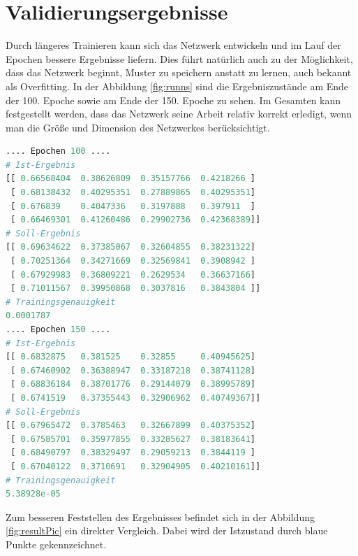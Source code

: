 \section{Validierungsergebnisse}

Durch längeres Trainieren kann sich das Netzwerk entwickeln und im Lauf der Epochen bessere Ergebnisse liefern. 
Dies führt natürlich auch zu der Möglichkeit, dass das Netzwerk beginnt, Muster zu speichern anstatt zu lernen, auch bekannt als Overfitting. 
In der Abbildung \ref{fig:runns} sind die Ergebniszustände am Ende der 100. Epoche sowie am Ende der 150. Epoche zu sehen. 
Im Gesamten kann festgestellt werden, dass das Netzwerk seine Arbeit relativ korrekt erledigt, wenn man die Größe und Dimension des Netzwerkes berücksichtigt. 
\begin{lstlisting}[caption={Ergebnisse am Ende der 100. Epoche und am Ende der 150. Epoche},label=fig:runns,captionpos=b,language=Python]
.... Epochen 100 ....
# Ist-Ergebnis 
[[ 0.66568404  0.38626809  0.35157766  0.4218266 ]
 [ 0.68138432  0.40295351  0.27889865  0.40295351]
 [ 0.676839    0.4047336   0.3197888   0.397911  ]
 [ 0.66469301  0.41260486  0.29902736  0.42368389]]
# Soll-Ergebnis
[[ 0.69634622  0.37385067  0.32604855  0.38231322]
 [ 0.70251364  0.34271669  0.32569841  0.3908942 ]
 [ 0.67929983  0.36809221  0.2629534   0.36637166]
 [ 0.71011567  0.39950868  0.3037816   0.3843804 ]]
# Trainingsgenauigkeit
0.0001787
.... Epochen 150 ....
# Ist-Ergebnis
[[ 0.6832875   0.381525    0.32855     0.40945625]
 [ 0.67460902  0.36388947  0.33187218  0.38741128]
 [ 0.68836184  0.38701776  0.29144079  0.38995789]
 [ 0.6741519   0.37355443  0.32906962  0.40749367]]
# Soll-Ergebnis
[[ 0.67965472  0.3785463   0.32667899  0.40375352]
 [ 0.67585701  0.35977855  0.33285627  0.38183641]
 [ 0.68490797  0.38329497  0.29059213  0.3844119 ]
 [ 0.67040122  0.3710691   0.32904905  0.40210161]]
# Trainingsgenauigkeit
5.38928e-05
\end{lstlisting}
Zum besseren Feststellen des Ergebnisses befindet sich in der Abbildung \ref{fig:resultPic} ein direkter Vergleich. 
Dabei wird der Istzustand durch blaue Punkte gekennzeichnet. 
